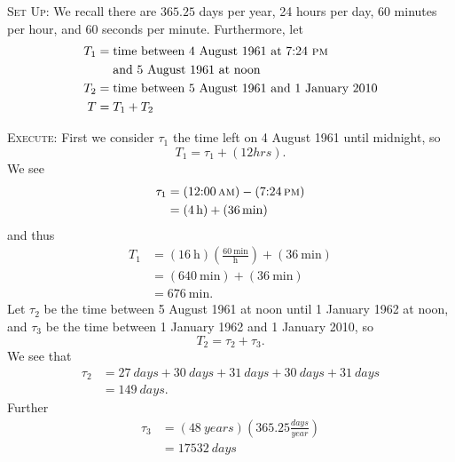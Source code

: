 \textsc{Set Up:}
We recall there are $365.25$ days per year, 24 hours per day, 60
minutes per hour, and 60 seconds per minute. Furthermore, let
\begin{subequations}
\begin{align}
T_{1}&=\mbox{time between 4 August 1961 at 7:24 \textsc{pm}}\nonumber\\
&\quad\mbox{ and 5
August 1961 at noon}\\
T_{2}&=\mbox{time between 5 August 1961 and 1 January 2010}\\
T &= T_{1}+T_{2}
\end{align}
\end{subequations}

\textsc{Execute:}
First we consider $\tau_{1}$ the time left on 4 August 1961 until
midnight, so 
\begin{equation}
T_{1} = \tau_{1} + (12\si{hrs}).
\end{equation}
We see
\begin{subequations}
\begin{align}
\tau_{1} &= (\mbox{12:00\thinspace\sc
am})-(\mbox{7:24\thinspace\sc pm})\\
&=(\SI{4}{\hour})+(\SI{36}{\minute})
\end{align}
\end{subequations}
and thus
\begin{subequations}
\begin{align}
T_{1} &= (\SI{16}{\hour})\left(\frac{\SI{60}{\minute}}{\si{\hour}}\right)+
(\SI{36}{\minute})\\
&=(\SI{640}{\minute})+(\SI{36}{\minute})\\
&=\SI{676}{\minute}.
\end{align}
\end{subequations}
Let $\tau_{2}$ be the time between 5 August 1961 at noon until 1
January 1962 at noon, and $\tau_{3}$ be the time between 1
January 1962 and 1 January 2010, so
\begin{equation}
T_{2} = \tau_2+\tau_3.
\end{equation}
We see that
\begin{subequations}
\begin{align}
\tau_2 &= \SI{27}{days}+\SI{30}{days}+\SI{31}{days}+
\SI{30}{days}+\SI{31}{days}\\
&=\SI{149}{days}.
\end{align}
\end{subequations}
Further
\begin{subequations}
\begin{align}
\tau_3 &=
(\SI{48}{years})\left(365.25\frac{\si{days}}{\si{year}}\right)\\
&=\SI{17532}{days}
\end{align}
\end{subequations}
